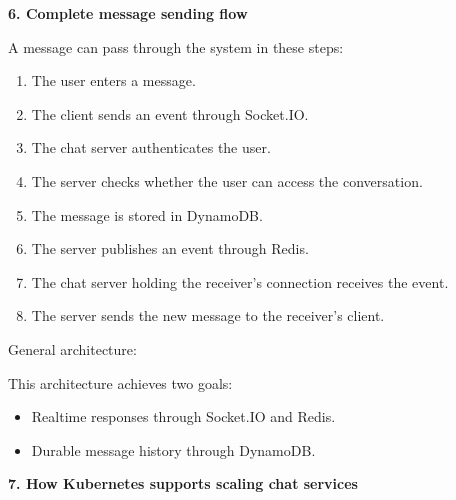\vspace{0.5em}\noindent\textbf{6. Complete message sending
flow}\par

A message can pass through the system in these steps:

\begin{enumerate}
\def\labelenumi{\arabic{enumi}.}
\tightlist
\item
  The user enters a message.
\item
  The client sends an event through Socket.IO.
\item
  The chat server authenticates the user.
\item
  The server checks whether the user can access the conversation.
\item
  The message is stored in DynamoDB.
\item
  The server publishes an event through Redis.
\item
  The chat server holding the receiver's connection receives the event.
\item
  The server sends the new message to the receiver's client.
\end{enumerate}

General architecture:

\begin{Shaded}
\begin{Highlighting}[]
\NormalTok{|}
\NormalTok{|}
\NormalTok{|}
\NormalTok{                         |}
\NormalTok{                         |}
\end{Highlighting}
\end{Shaded}

This architecture achieves two goals:

\begin{itemize}
\tightlist
\item
  Realtime responses through Socket.IO and Redis.
\item
  Durable message history through DynamoDB.
\end{itemize}

\vspace{0.5em}\noindent\textbf{7. How Kubernetes supports scaling chat
services}\par


